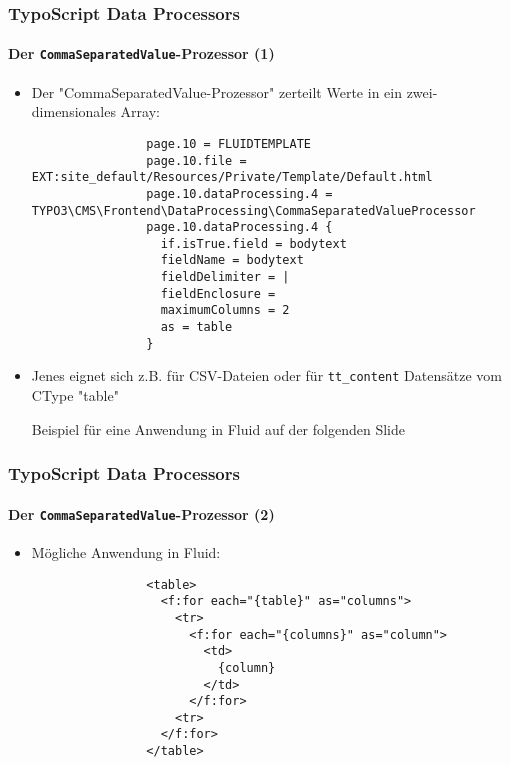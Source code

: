 \begin{frame}[fragile]
	\frametitle{TypoScript Data Processors}
	\framesubtitle{Der \texttt{CommaSeparatedValue}-Prozessor (1)}

	\lstset{basicstyle=\tiny\ttfamily}

	\begin{itemize}

		\item Der "CommaSeparatedValue-Prozessor" zerteilt Werte in ein zwei-dimensionales Array:

			\begin{lstlisting}
				page.10 = FLUIDTEMPLATE
				page.10.file = EXT:site_default/Resources/Private/Template/Default.html
				page.10.dataProcessing.4 = TYPO3\CMS\Frontend\DataProcessing\CommaSeparatedValueProcessor
				page.10.dataProcessing.4 {
				  if.isTrue.field = bodytext
				  fieldName = bodytext
				  fieldDelimiter = |
				  fieldEnclosure =
				  maximumColumns = 2
				  as = table
				}
			\end{lstlisting}

		\item Jenes eignet sich z.B. für CSV-Dateien oder für \texttt{tt\_content} Datensätze vom CType "table"

			\vspace{0.2cm}
			\small
				Beispiel für eine Anwendung in Fluid auf der folgenden Slide
			\normalsize

	\end{itemize}

\end{frame}


\begin{frame}[fragile]
	\frametitle{TypoScript Data Processors}
	\framesubtitle{Der \texttt{CommaSeparatedValue}-Prozessor (2)}

	\lstset{basicstyle=\tiny\ttfamily}

	\begin{itemize}

		\item Mögliche Anwendung in Fluid:

			\begin{lstlisting}
				<table>
				  <f:for each="{table}" as="columns">
				    <tr>
				      <f:for each="{columns}" as="column">
				        <td>
				          {column}
				        </td>
				      </f:for>
				    <tr>
				  </f:for>
				</table>
			\end{lstlisting}

	\end{itemize}

\end{frame}

